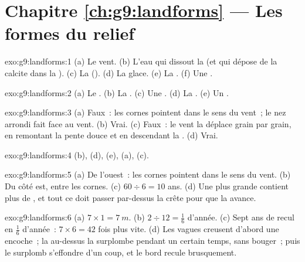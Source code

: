 \section*{Chapitre \ref{ch:g9:landforms} --- Les formes du relief}

\begin{solution}{exo:g9:landforms:1}
(a) Le vent. (b) L'eau qui dissout la  (et qui dépose de la calcite
dans la ). (c) La  (). (d) La glace. (e) La .
(f) Une .
\end{solution}

\begin{solution}{exo:g9:landforms:2}
(a) Le . (b) La . (c) Une . (d) La . (e) Un .
\end{solution}

\begin{solution}{exo:g9:landforms:3}
(a) Faux~: les cornes pointent dans le sens du vent~; le nez arrondi fait
face au vent. (b) Vrai. (c) Faux~: le vent la déplace grain par grain, en
remontant la pente douce et en descendant la . (d) Vrai.
\end{solution}

\begin{solution}{exo:g9:landforms:4}
(b), (d), (e), (a), (c).
\end{solution}

\begin{solution}{exo:g9:landforms:5}
(a) De l'ouest~: les cornes pointent dans le sens du vent. (b) Du côté
est, entre les cornes. (c) $60 \div 6 = 10$ ans. (d) Une  plus grande
contient plus de , et tout ce  doit passer par-dessus la crête
pour que la  avance.
\end{solution}

\begin{solution}{exo:g9:landforms:6}
(a) $7 \times 1 = \qty{7}{m}$. (b) $2 \div 12 = \frac{1}{6}$ d'année.
(c) Sept ans de recul en $\frac{1}{6}$ d'année~: $7 \times 6 = 42$
fois plus vite. (d) Les vagues creusent d'abord une encoche~; la 
au-dessus la surplombe pendant un certain temps, sans bouger~; puis le
surplomb s'effondre d'un coup, et le bord recule brusquement.
\end{solution}

